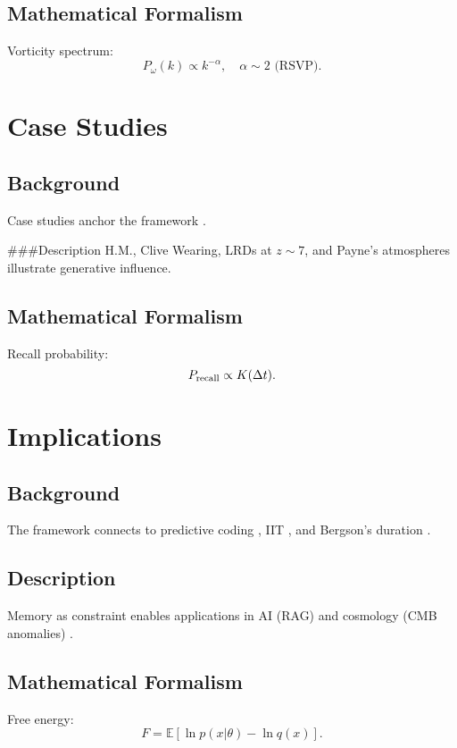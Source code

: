 \documentclass[12pt]{article}
\begin{document}
\subsection{Mathematical Formalism}
Vorticity spectrum:
\begin{equation}
P_\omega(k) \propto k^{-\alpha}, \quad \alpha \sim 2 \text{ (RSVP)}.
\end{equation}

\section{Case Studies}
\subsection{Background}
Case studies anchor the framework \citep{Barenholtz2025, PacucciLoeb2025, Payne1925}.

###{Description}
H.M., Clive Wearing, LRDs at $z \sim 7$, and Payne’s atmospheres illustrate generative influence.

\subsection{Mathematical Formalism}
Recall probability:
\begin{equation}
P_{\rm recall} \propto K(\Delta t).
\end{equation}

\section{Implications}
\subsection{Background}
The framework connects to predictive coding \citep{Friston2010}, IIT \citep{Tononi2004}, and Bergson’s duration \citep{Bergson1910}.

\subsection{Description}
Memory as constraint enables applications in AI (RAG) and cosmology (CMB anomalies) \citep{Barenholtz2025, PacucciLoeb2025}.

\subsection{Mathematical Formalism}
Free energy:
\begin{equation}
F = \mathbb{E}[\ln p(x|\theta) - \ln q(x)].
\end{equation}
\end{document}
